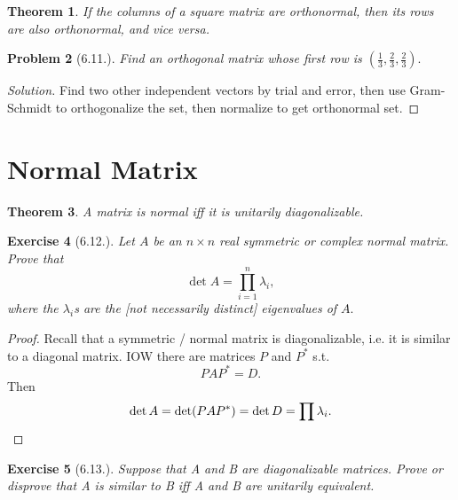 \documentclass[14pt]{extarticle}
\theoremstyle{plain}
\newtheorem{theorem}{Theorem}
\newtheorem{problem}[theorem]{Problem}
\newtheorem{exercise}[theorem]{Exercise}
\theoremstyle{definition}
\theoremstyle{remark}
\newenvironment{solution}{\begin{proof}[Solution]}{\end{proof}}
\newcommand{\0}{\varnothing}
\newcommand{\<}{\langle}
\renewcommand{\>}{\rangle}
\begin{document}
\begin{theorem}
  If the columns of a square matrix are orthonormal, then its rows are also orthonormal, and vice versa.
\end{theorem}

\begin{problem}[6.11.]
  Find an orthogonal matrix whose first row is \( (\frac{1}{3}, \frac{2}{3}, \frac{2}{3}). \)
\end{problem}

\begin{solution}
  Find two other independent vectors by trial and error, then use Gram-Schmidt to orthogonalize the set, then normalize to get orthonormal set.
\end{solution}

\section{Normal Matrix}

\begin{theorem}
  A matrix is normal iff it is unitarily diagonalizable.
\end{theorem}

\begin{exercise}[6.12.]
  Let \( A \) be an \( n \times n \) real symmetric or complex normal matrix. Prove that
  \[
  \det A = \prod_{i=1}^n \lambda_i,
  \]
  where the \( \lambda_i \)s are the [not necessarily distinct] eigenvalues of \( A. \)
\end{exercise}

\begin{proof}
  Recall that a symmetric / normal matrix is diagonalizable, i.e. it is similar to a diagonal matrix. IOW there are matrices \( P \) and \( P^* \) s.t.
  \[
  P A P^* = D.
  \]
  Then
  \[
  \det A = \det (P A P^*) = \det D = \prod \lambda_i. \qedhere
  \]
\end{proof}

\begin{exercise}[6.13.]
  Suppose that A and B are diagonalizable matrices. Prove or disprove that A is similar to B iff A and B are unitarily equivalent.
\end{exercise}
\end{document}
